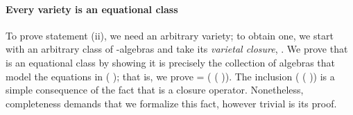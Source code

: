 \paragraph*{Every variety is an equational class}
To prove statement (ii), we need an arbitrary variety; to obtain one, we start with an arbitrary class
 of -algebras and take its \emph{varietal closure},  .
We prove that   is an equational class by showing it is precisely the collection of
algebras that model the equations in  ( ); that is, we prove
  =  ( ( )).
The inclusion     ( ( )) is a simple consequence of the fact that   is a closure operator. Nonetheless, completeness demands
that we formalize this fact, however trivial is its proof.

